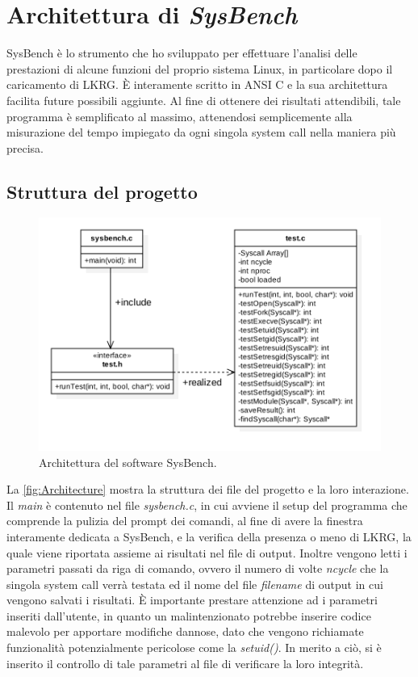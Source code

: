 \chapter{Architettura di \emph{SysBench}}

\label{Chapter3}

SysBench è lo strumento che ho sviluppato per effettuare l'analisi delle prestazioni di alcune funzioni del proprio sistema Linux, in particolare dopo il caricamento di LKRG. È interamente scritto in ANSI C e la sua architettura facilita future possibili aggiunte. Al fine di ottenere dei risultati attendibili, tale programma è semplificato al massimo, attenendosi semplicemente alla misurazione del tempo impiegato da ogni singola system call nella maniera più precisa.

\section{Struttura del progetto}

\begin{figure}[!ht]
\centering
\includegraphics[scale=0.3]{Figures/Architecture}
\caption[Architettura del software SysBench]{Architettura del software SysBench.}
\label{fig:Architecture}
\end{figure}

La \autoref{fig:Architecture} mostra la struttura dei file del progetto e la loro interazione. Il \emph{main} è contenuto nel file \emph{sysbench.c}, in cui avviene il setup del programma che comprende la pulizia del prompt dei comandi, al fine di avere la finestra interamente dedicata a SysBench, e la verifica della presenza o meno di LKRG, la quale viene riportata assieme ai risultati nel file di output. Inoltre vengono letti i parametri passati da riga di comando, ovvero il numero di volte \emph{ncycle} che la singola system call verrà testata ed il nome del file \emph{filename} di output in cui vengono salvati i risultati. È importante prestare attenzione ad i parametri inseriti dall'utente, in quanto un malintenzionato potrebbe inserire codice malevolo per apportare modifiche dannose, dato che vengono richiamate funzionalità potenzialmente pericolose come la \emph{setuid()}. In merito a ciò, si è inserito il controllo di tale parametri al file di verificare la loro integrità.

